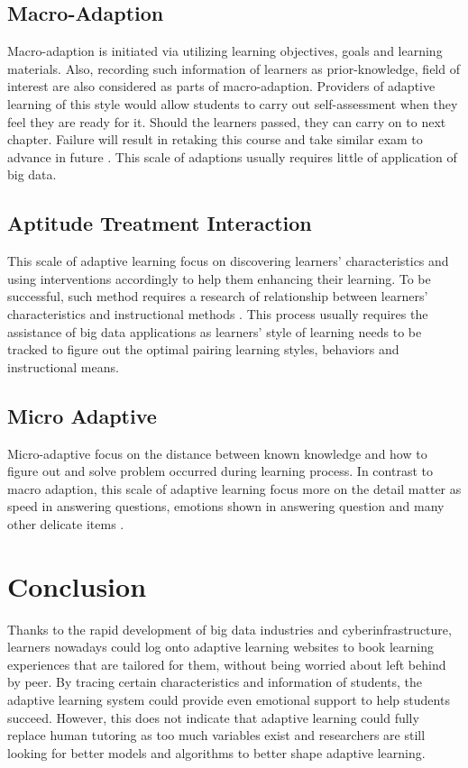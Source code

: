 \documentclass[sigconf]{acmart}
\begin{document}
\subsection{Macro-Adaption}
Macro-adaption is initiated via utilizing learning objectives, goals and learning materials. Also, recording such information of learners as prior-knowledge, field of interest are also considered as parts of macro-adaption. Providers of adaptive learning of this style would allow students to carry out self-assessment when they feel they are ready for it. Should the learners passed, they can carry on to next chapter. Failure will result in retaking this course and take similar exam to advance in future \cite{Aleven2002}. This scale of adaptions usually requires little of application of big data.
\subsection{Aptitude Treatment Interaction}
This scale of adaptive learning focus on discovering learners’ characteristics and using interventions accordingly to help them enhancing their learning. To be successful, such method requires a research of relationship between learners’ characteristics and instructional methods \cite{Graf2013}. This process usually requires the assistance of big data applications as learners’ style of learning needs to be tracked to figure out the optimal pairing learning styles, behaviors and instructional means.
\subsection{Micro Adaptive}
Micro-adaptive focus on the distance between known knowledge and how to figure out and solve problem occurred during learning process. In contrast to macro adaption, this scale of adaptive learning focus more on the detail matter as speed in answering questions, emotions shown in answering question and many other delicate items \cite{Brusilovsky2007}.
\section{Conclusion}
Thanks to the rapid development of big data industries and cyberinfrastructure, learners nowadays could log onto adaptive learning websites to book learning experiences that are tailored for them, without being worried about left behind by peer. By tracing certain characteristics and information of students, the adaptive learning system could provide even emotional support to help students succeed. However, this does not indicate that adaptive learning could fully replace human tutoring as too much variables exist and researchers are still looking for better models and algorithms to better shape adaptive learning.







 
\end{document}
